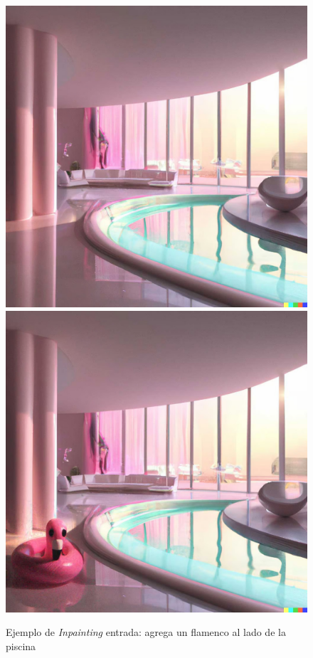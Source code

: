 \documentclass[runningheads]{llncs} %
\begin{document}
\begin{figure}
    \centering
    \includegraphics[scale=0.15]{ej3.1-dalle.jpg}
    \includegraphics[scale=0.15]{ej3.2-dalle.jpg}
    \caption{Ejemplo de \textit{Inpainting} entrada: agrega un flamenco
    al lado de la piscina \cite{ej-dalle}}
    \label{fig:dalle-ej3}
\end{figure}
\end{document}
